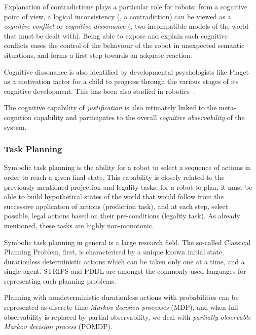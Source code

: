 Explanation of contradictions plays a particular role for robots: from a
cognitive point of view, a logical inconsistency (\ie, a contradiction) can be
viewed as a \emph{cognitive conflict} or \emph{cognitive dissonance} (\ie, two
incompatible models of the world that must be dealt with). Being able to expose
and explain such cognitive conflicts eases the control of the behaviour of the
robot in unexpected semantic situations, and forms a first step towards an
adquate reaction.

Cognitive dissonance is also identified by developmental psychologists like
Piaget as a motivation factor for a child to progress through the various
stages of its cognitive development. This has been also studied in
robotics~\cite{Oudeyer2007}.


The cognitive capability of \emph{justification} is also intimately linked to
the meta-cognition capability and participates to the overall \emph{cognitive
observability} of the system.

\subsubsection{Task Planning}
\label{sect|planning}

Symbolic task planning is the ability for a robot to select a sequence of
actions in order to reach a given final state. This capability is closely
related to the previously mentioned projection and legality tasks: for a robot
to plan, it must be able to build hypothetical states of the world that would
follow from the successive application of actions (prediction task), and at
each step, select possible, legal actions based on their pre-conditions
(legality task). As already mentioned, these tasks are highly non-monotonic.


Symbolic task planning in general is a large research
field\cite{Russell2009planning}. The so-called Classical Planning Problem,
first, is characterised by a unique known initial state, durationless
deterministic actions which can be taken only one at a time, and a single
agent. STRIPS and PDDL are amongst the commonly used languages for representing
such planning problems.

Planning with nondeterministic durationless actions with probabilities can be
represented as discrete-time \emph{Markov decision processes} (MDP), and when
full observability is replaced by partial observability, we deal with
\emph{partially observable Markov decision process} (POMDP).

